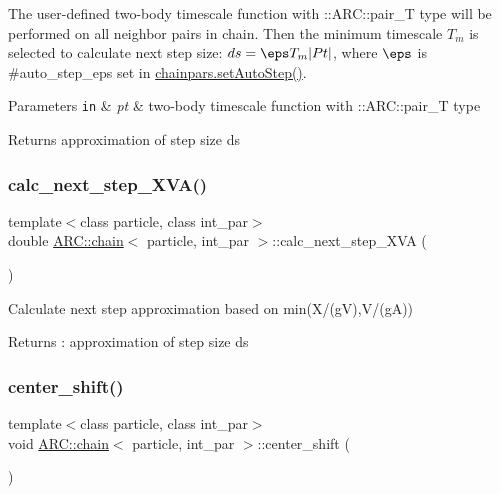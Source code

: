 The user-\/defined two-\/body timescale function with \+::\+A\+R\+C\+::pair\+\_\+T type will be performed on all neighbor pairs in chain. Then the minimum timescale $ T_m$ is selected to calculate next step size\+: $ ds = \eps T_m |Pt|$, where $\eps$ is \#auto\+\_\+step\+\_\+eps set in \hyperlink{classARC_1_1chainpars_a07a9734583565af190241ec32a6357c5}{chainpars.\+set\+Auto\+Step()}. 
\begin{DoxyParams}[1]{Parameters}
\mbox{\tt in}  & {\em pt} & two-\/body timescale function with \+::\+A\+R\+C\+::pair\+\_\+T type \\
\hline
\end{DoxyParams}
\begin{DoxyReturn}{Returns}
approximation of step size ds 
\end{DoxyReturn}
\hypertarget{classARC_1_1chain_a282545e539f7402b1d44bf285730490a}{}\label{classARC_1_1chain_a282545e539f7402b1d44bf285730490a} 
\subsubsection{\texorpdfstring{calc\+\_\+next\+\_\+step\+\_\+\+X\+V\+A()}{calc\_next\_step\_XVA()}}
{\footnotesize\ttfamily template$<$class particle, class int\+\_\+par$>$ \\
double \hyperlink{classARC_1_1chain}{A\+R\+C\+::chain}$<$ particle, int\+\_\+par $>$\+::calc\+\_\+next\+\_\+step\+\_\+\+X\+VA (\begin{DoxyParamCaption}{ }\end{DoxyParamCaption})\hspace{0.3cm}{\ttfamily [inline]}}



Calculate next step approximation based on min(X/(gV),V/(gA)) 

\begin{DoxyReturn}{Returns}
\+: approximation of step size ds 
\end{DoxyReturn}
\hypertarget{classARC_1_1chain_a73419f14f724668f4858a13c01cf7b70}{}\label{classARC_1_1chain_a73419f14f724668f4858a13c01cf7b70} 
\subsubsection{\texorpdfstring{center\+\_\+shift()}{center\_shift()}}
{\footnotesize\ttfamily template$<$class particle, class int\+\_\+par$>$ \\
void \hyperlink{classARC_1_1chain}{A\+R\+C\+::chain}$<$ particle, int\+\_\+par $>$\+::center\+\_\+shift (\begin{DoxyParamCaption}{ }\end{DoxyParamCaption})\hspace{0.3cm}{\ttfamily [inline]}}



